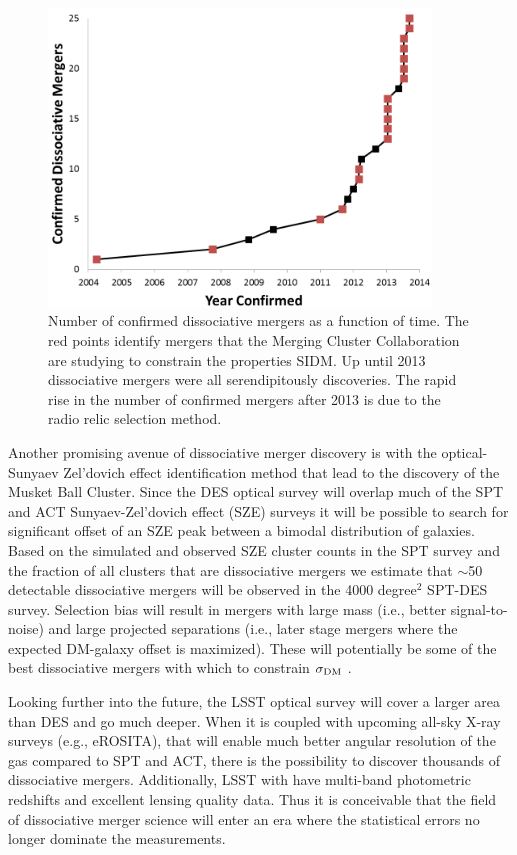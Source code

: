 \begin{figure}
\centering
\includegraphics[width=4in]{Chapter5/NumberOfConfirmedDissociativeMergers.png}
\caption[Number of confirmed dissociative mergers as a function of time.]{
Number of confirmed dissociative mergers as a function of time.
The red points identify mergers that the Merging Cluster Collaboration are studying to  constrain the properties SIDM.
Up until 2013 dissociative mergers were all serendipitously discoveries.
The rapid rise in the number of confirmed mergers after 2013 is due to the radio relic selection method.
}
\label{figure:N_Mergers}
\end{figure}

Another promising avenue of dissociative merger discovery is with the optical-Sunyaev Zel'dovich effect identification method that lead to the discovery of the Musket Ball Cluster.
Since the DES optical survey \citep{Collaboration:2005vv} will overlap much of the SPT \citep{Ruhl:2004io} and ACT \citep{Hincks:2010ff} Sunyaev-Zel'dovich effect (SZE) surveys it will be possible to search for significant offset of an SZE peak between a bimodal distribution of galaxies.
Based on the simulated and observed SZE cluster counts in the SPT survey \citep{Vanderlinde:2010hr, Song:2012tz} and the fraction of all clusters that are dissociative mergers \citep{ForeroRomero:2010cc} we estimate that $\sim$50 detectable dissociative mergers will be observed in the 4000 degree$^2$ SPT-DES survey.  Selection bias will result in mergers with large mass (i.e., better signal-to-noise) and large projected separations (i.e., later stage mergers where the expected DM-galaxy offset is maximized).  These will potentially be some of the best dissociative mergers with which to constrain $\sigma_{\rm DM}$ .

Looking further into the future, the LSST optical survey \citep{Tyson:2002hn} will cover a larger area than DES and go much deeper.
When it is coupled with upcoming all-sky X-ray surveys (e.g., eROSITA), that will enable much better angular resolution of the gas compared to SPT and ACT, there is the possibility to discover thousands of dissociative mergers.
Additionally, LSST with have multi-band photometric redshifts and excellent lensing quality data.
Thus it is conceivable that the field of dissociative merger science will enter an era where the statistical errors no longer dominate the measurements. 

